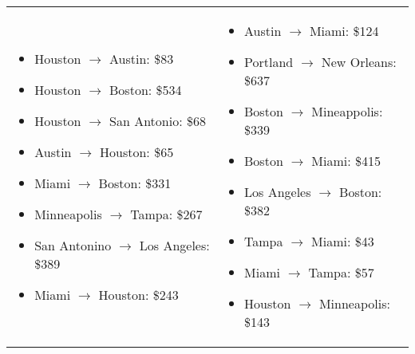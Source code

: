 \documentclass[11pt,addpoints]{exam}
\begin{document}
\begin{questions}




\newpage



\begin{table}[H]
  \begin{tabular}{p{}p{}}
\begin{itemize}
  \item Houston $\to$ Austin: \$83
  \item Houston $\to$ Boston: \$534
  \item Houston $\to$ San Antonio: \$68
  \item Austin $\to$ Houston: \$65
  \item Miami $\to$ Boston: \$331
  \item Minneapolis $\to$ Tampa: \$267
  \item San Antonino $\to$ Los Angeles: \$389
  \item Miami $\to$ Houston: \$243
\end{itemize} &
\begin{itemize}
  \item Austin $\to$ Miami: \$124
  \item Portland $\to$ New Orleans: \$637
  \item Boston $\to$ Mineappolis: \$339
  \item Boston $\to$ Miami: \$415
  \item Los Angeles $\to$ Boston: \$382 
  \item Tampa $\to$ Miami: \$43
  \item Miami $\to$ Tampa: \$57
  \item Houston $\to$ Minneapolis: \$143
\end{itemize}
\end{tabular}
\end{table}


\end{questions}
\end{document}
